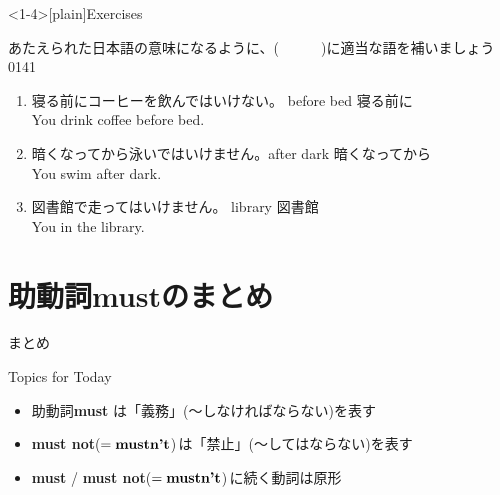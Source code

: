 \documentclass[aspectratio=169,xcolor={dvipsnames,table}]{beamer}
\newcommand{\myaudio}[1]{\href{#1}{\faVolumeUp}}
\begin{document}
\begin{frame}<1-4>[plain]{Exercises}
 
あたえられた日本語の意味になるように、(~~~~~~)に適当な語を補いましょう
\hfill{\tiny 0141}\,{\scriptsize \myaudio{./audio/013_must_05.mp3}}


\begin{enumerate}
 \item {\small 寝る前にコーヒーを飲んではいけない。}%
\hfill{}{\scriptsize before bed 寝る前に}\\
You  drink coffee before bed.
 \item {\small 暗くなってから泳いではいけません。}\hfill{}{\scriptsize after dark 暗くなってから}\\
 You  swim after dark.
 \item {\small 図書館で走ってはいけません。}%
\hfill{}{\scriptsize library  図書館}\\
 You   in the library.
\end{enumerate}
\end{frame}

\section{助動詞mustのまとめ}
\begin{frame}[plain]{まとめ}
 \Large

\begin{block}{Topics for Today}
\small
\begin{itemize}[square]
 \item<2->  助動詞{\bfseries must} は「義務」(〜しなければならない)を表す%
\hfill{}{\scriptsize {}}
 \item<3->  {\bfseries must not}($=\text{\bfseries mustn't}$)\,は「禁止」(〜してはならない)を表す%
\hfill{}{\scriptsize {}}
 \item<4->  {\bfseries must} / {\bfseries must not}($=\text{\bfseries mustn't}$)\,に続く動詞は原形
\end{itemize}
\end{block}

\vfill


\end{frame}
\end{document}
